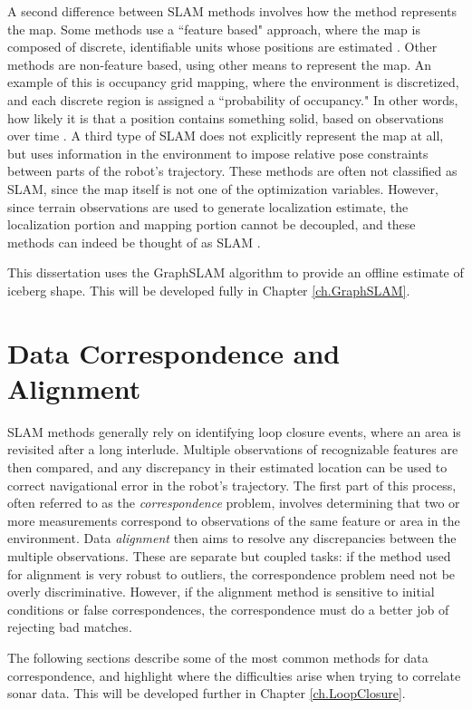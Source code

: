 A second difference between SLAM methods involves how the method represents the map. Some methods use a ``feature based" approach, where the map is composed of discrete, identifiable units whose positions are estimated \cite{Durrant2006}. Other methods are non-feature based, using other means to represent the map. An example of this is occupancy grid mapping, where the environment is discretized, and each discrete region is assigned a ``probability of occupancy." In other words, how likely it is that a position contains something solid, based on observations over time \cite{Fairfield2007}.  A third type of SLAM does not explicitly represent the map at all, but uses information in the environment to impose relative pose constraints between parts of the robot's trajectory. These methods are often not classified as SLAM, since the map itself is not one of the optimization variables. However, since terrain observations are used to generate localization estimate,  the localization portion and mapping portion cannot be decoupled, and these methods can indeed be thought of as SLAM \cite{Caress2008}. 

This dissertation uses the GraphSLAM algorithm \cite{Thrun2006} to provide an offline estimate of iceberg shape. This will be developed fully in Chapter \ref{ch.GraphSLAM}. 


\section{Data Correspondence and Alignment}

SLAM methods generally rely on identifying loop closure events, where an area is revisited after a long interlude. Multiple observations of recognizable features are then compared, and any discrepancy in their estimated location can be used to correct navigational error in the robot's trajectory. The first part of this process, often referred to as the \emph{correspondence} problem, involves determining that two or more measurements correspond to observations of the same feature or area in the environment. Data \emph{alignment} then aims to resolve any discrepancies between the multiple observations. These are separate but coupled tasks: if the method used for alignment is very robust to outliers, the correspondence problem need not be overly discriminative. However, if the alignment method is sensitive to initial conditions or false correspondences, the correspondence must do a better job of rejecting bad matches. 

The following sections describe some of the most common methods for data correspondence, and highlight where the difficulties arise when trying to correlate sonar data. This will be developed further in Chapter \ref{ch.LoopClosure}.


